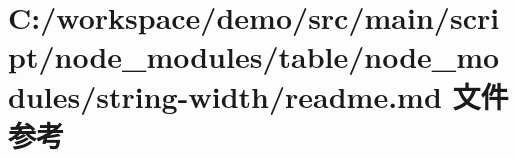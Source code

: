 \hypertarget{node__modules_2table_2node__modules_2string-width_2_r_e_a_d_m_e_8md}{}\section{C\+:/workspace/demo/src/main/script/node\+\_\+modules/table/node\+\_\+modules/string-\/width/readme.md 文件参考}
\label{node__modules_2table_2node__modules_2string-width_2_r_e_a_d_m_e_8md}
